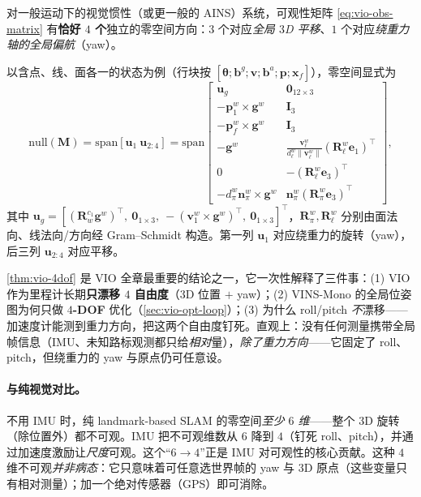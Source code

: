 \begin{theorem}\label{thm:vio-4dof}
对一般运动下的视觉惯性（或更一般的 AINS）系统，可观性矩阵 \cref{eq:vio-obs-matrix} 有\textbf{恰好 $4$ 个}独立的零空间方向：$3$ 个对应\emph{全局 $3$D 平移}、$1$ 个对应\emph{绕重力轴的全局偏航}（yaw）\cite{carlone2026handbook,huang2019vins}。

以含点、线、面各一的状态为例（行块按 $[\boldsymbol{\theta};\mathbf{b}^g;\mathbf{v};\mathbf{b}^a;\mathbf{p};\boldsymbol{x}_f]$），零空间显式为
\begin{equation}
  \mathrm{null}(\mathbf{M})=\mathrm{span}[\mathbf{u}_1\ \mathbf{u}_{2:4}]=\mathrm{span}\begin{bmatrix}
  \mathbf{u}_g & \mathbf{0}_{12\times3}\\
  -\mathbf{p}_1^w\times\mathbf{g}^w & \mathbf{I}_3\\
  -\mathbf{p}_f^w\times\mathbf{g}^w & \mathbf{I}_3\\
  -\mathbf{g}^w & \tfrac{\mathbf{v}_\ell^w}{d_\ell^w\|\mathbf{v}_\ell^w\|}(\mathbf{R}_\ell^w\mathbf{e}_1)^\top\\
  0 & -(\mathbf{R}_\ell^w\mathbf{e}_3)^\top\\
  -d_\pi^w\mathbf{n}_\pi^w\times\mathbf{g}^w & \mathbf{n}_\pi^w(\mathbf{R}_\pi^w\mathbf{e}_3)^\top
  \end{bmatrix},
  \label{eq:vio-nullspace}
\end{equation}
其中 $\mathbf{u}_g=[(\mathbf{R}_w^{c_1}\mathbf{g}^w)^\top,\ \mathbf{0}_{1\times3},\ -(\mathbf{v}_1^w\times\mathbf{g}^w)^\top,\ \mathbf{0}_{1\times3}]^\top$，$\mathbf{R}_\pi^w,\mathbf{R}_\ell^w$ 分别由面法向、线法向/方向经 Gram--Schmidt 构造。第一列 $\mathbf{u}_1$ 对应绕重力的旋转（yaw），后三列 $\mathbf{u}_{2:4}$ 对应平移。
\end{theorem}

\begin{insight}
\cref{thm:vio-4dof} 是 VIO 全章最重要的结论之一，它一次性解释了三件事：(1) VIO 作为里程计长期\textbf{只漂移 $4$ 自由度}（$3$D 位置 $+$ yaw）；(2) VINS-Mono 的全局位姿图为何只做 \textbf{$4$-DOF} 优化（\cref{sec:vio-opt-loop}）；(3) 为什么 roll/pitch \emph{不}漂移——加速度计能测到重力方向，把这两个自由度钉死。直观上：没有任何测量携带全局帧信息（IMU、未知路标观测都只给\emph{相对}量），\emph{除了重力方向}——它固定了 roll、pitch，但绕重力的 yaw 与原点仍可任意设。
\end{insight}

\paragraph{与纯视觉对比。}
不用 IMU 时，纯 landmark-based SLAM 的零空间\emph{至少 $6$ 维}——整个 $3$D 旋转（除位置外）都不可观\cite{carlone2026handbook}。IMU 把不可观维数从 $6$ 降到 $4$（钉死 roll、pitch），并通过加速度激励让\emph{尺度}可观。这个“$6\to4$”正是 IMU 对可观性的核心贡献。这种 $4$ 维不可观\emph{并非病态}：它只意味着可任意选世界帧的 yaw 与 $3$D 原点（这些变量只有相对测量）；加一个绝对传感器（GPS）即可消除。

